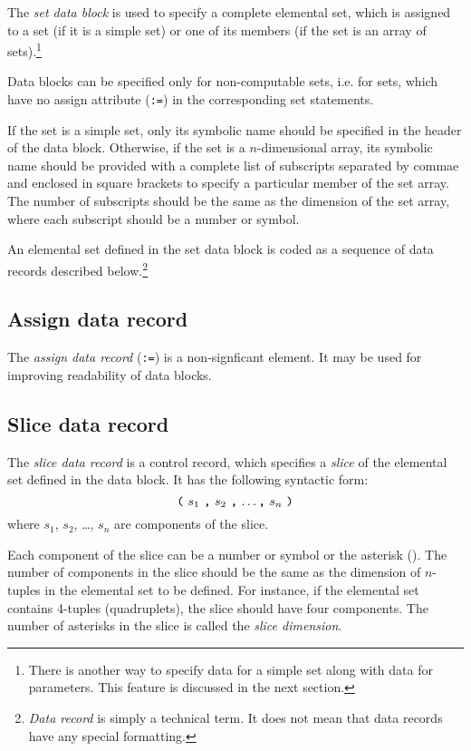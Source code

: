 \documentclass[11pt]{report}
\begin{document}
The {\it set data block} is used to specify a complete elemental set,
which is assigned to a set (if it is a simple set) or one of its
members (if the set is an array of sets).\footnote{There is another way
to specify data for a simple set along with data for parameters. This
feature is discussed in the next section.}

Data blocks can be specified only for non-computable sets, i.e. for
sets, which have no assign attribute ({\tt:=}) in the corresponding set
statements.

If the set is a simple set, only its symbolic name should be specified
in the header of the data block. Otherwise, if the set is a
$n$-dimensional array, its symbolic name should be provided with a
complete list of subscripts separated by commae and enclosed in square
brackets to specify a particular member of the set array. The number of
subscripts should be the same as the dimension of the set array, where
each subscript should be a number or symbol.

An elemental set defined in the set data block is coded as a sequence
of data records described below.\footnote{{\it Data record} is simply a
technical term. It does not mean that data records have any special
formatting.}

\subsection{Assign data record}

The {\it assign data record} ({\tt:=}) is a non-signficant element.
It may be used for improving readability of data blocks.

\subsection{Slice data record}

The {\it slice data record} is a control record, which specifies a
{\it slice} of the elemental set defined in the data block. It has the
following syntactic form:
$$\mbox{{\tt(} $s_1$ {\tt,} $s_2$ {\tt,} \dots {\tt,} $s_n$ {\tt)}}$$
where $s_1$, $s_2$, \dots, $s_n$ are components of the slice.

Each component of the slice can be a number or symbol or the asterisk
({\tt*}). The number of components in the slice should be the same as
the dimension of $n$-tuples in the elemental set to be defined. For
instance, if the elemental set contains 4-tuples (quadruplets), the
slice should have four components. The number of asterisks in the slice
is called the {\it slice dimension}.
\end{document}

